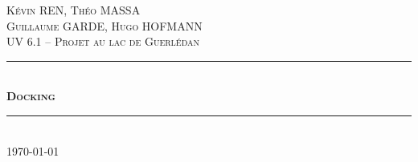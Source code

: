 \begin{titlepage}

\newcommand{\HRule}{\rule{\linewidth}{0.5mm}} %

\center %
 

\vspace{3cm}
\textsc{\LARGE Kévin REN,  Théo MASSA \\[0.5cm] Guillaume GARDE, Hugo HOFMANN } \\ [1.5cm]
\textsc{\Large UV 6.1 -- Projet au lac de Guerlédan}\\[1.5cm]

\HRule \\[0.4cm]
{ \huge \bfseries \textsc{Docking\\[0.3cm]}}
\HRule \\[.5cm]


\vspace{1cm}
{\huge \today}\\[1cm] %


\end{titlepage}
